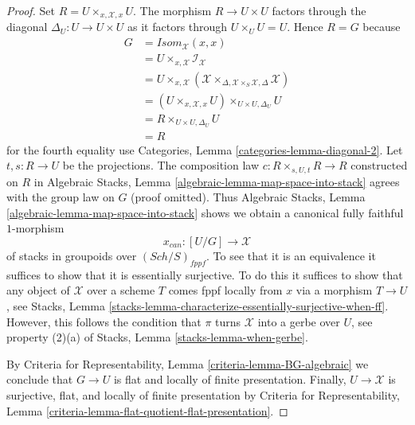 \documentclass[10pt,a4paper]{amsart}
\theoremstyle{plain}
\theoremstyle{definition}
\theoremstyle{remark}
\numberwithin{equation}{subsection}
\def\Sch{\mathit{Sch}}
\begin{document}
\begin{proof}
Set $R = U \times_{x, \mathcal{X}, x} U$. The morphism $R \to U \times U$
factors through the diagonal $\Delta_U : U \to U \times U$ as it factors
through $U \times_U U = U$. Hence $R = G$ because
\begin{align*}
G & = \mathit{Isom}_\mathcal{X}(x, x) \\
& = U \times_{x, \mathcal{X}} \mathcal{I}_\mathcal{X} \\
& = U \times_{x, \mathcal{X}}
(\mathcal{X}
\times_{\Delta, \mathcal{X} \times_S \mathcal{X}, \Delta}
\mathcal{X}) \\
& = (U \times_{x, \mathcal{X}, x} U) \times_{U \times U, \Delta_U} U \\
& = R \times_{U \times U, \Delta_U} U \\
& = R
\end{align*}
for the fourth equality use
Categories, Lemma \ref{categories-lemma-diagonal-2}.
Let $t, s : R \to U$ be the projections.
The composition law $c : R \times_{s, U, t} R \to R$ constructed on $R$ in
Algebraic Stacks, Lemma \ref{algebraic-lemma-map-space-into-stack}
agrees with the group law on $G$ (proof omitted). Thus
Algebraic Stacks, Lemma \ref{algebraic-lemma-map-space-into-stack}
shows we obtain a canonical fully faithful $1$-morphism
$$
x_{can} : [U/G] \longrightarrow \mathcal{X}
$$
of stacks in groupoids over $(\Sch/S)_{fppf}$. To see that it is
an equivalence it suffices to show that it is essentially surjective.
To do this it suffices to show that any object of $\mathcal{X}$ over
a scheme $T$ comes fppf locally from $x$ via a morphism $T \to U$, see
Stacks, Lemma \ref{stacks-lemma-characterize-essentially-surjective-when-ff}.
However, this follows the condition that $\pi$ turns $\mathcal{X}$
into a gerbe over $U$, see property (2)(a) of
Stacks, Lemma \ref{stacks-lemma-when-gerbe}.

\medskip\noindent
By
Criteria for Representability, Lemma \ref{criteria-lemma-BG-algebraic}
we conclude that $G \to U$ is flat and locally of finite presentation.
Finally, $U \to \mathcal{X}$ is surjective, flat, and locally of finite
presentation by
Criteria for Representability, Lemma
\ref{criteria-lemma-flat-quotient-flat-presentation}.
\end{proof}
\end{document}
